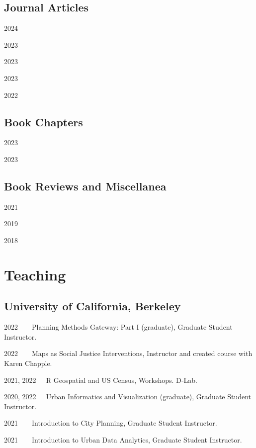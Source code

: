 \documentclass[12pt,letterpaper]{report}
\begin{document}
    \subsection*{Journal Articles}
    \begin{tablist}
        \item[2024] \tab{}
        \item[2023] \tab{} 
        \item[2023] \tab{}
        \item[2023] \tab{}
        \item[2022] \tab{} 
    \end{tablist}

    \subsection*{Book Chapters}
    \begin{tablist}  
        \item[2023] \tab{}
        \item[2023] \tab{}
    \end{tablist}

    \subsection*{Book Reviews and Miscellanea}
    \begin{tablist}  
        \item[2021] \tab{}
        \item[2019] \tab{}
        \item[2018] \tab{}
    \end{tablist}


    \section*{Teaching}
    \subsection*{University of California, Berkeley}
    \begin{tablist}
        \item[2022] \tab{}$\>$ $\>$ $\>$ Planning Methods Gateway: Part I (graduate), Graduate Student Instructor.
        \item[2022] \tab{}$\>$ $\>$ $\>$ Maps as Social Justice Interventions, Instructor and created course with Karen Chapple.
        \item[2021, 2022] $\>$ $\>$  R Geospatial and US Census, Workshops. D‐Lab.
        \item[2020, 2022] $\>$ $\>$  Urban Informatics and Visualization (graduate), Graduate Student Instructor.
        \item[2021] \tab{} $\>$ $\>$ $\>$  Introduction to City Planning, Graduate Student Instructor.
        \item[2021] \tab{} $\>$ $\>$ $\>$  Introduction to Urban Data Analytics, Graduate Student Instructor.
    \end{tablist}
    
\end{document}
